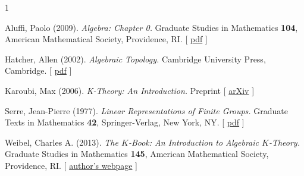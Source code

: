 \documentclass[12pt,reqno]{amsart}
\theoremstyle{plain}
\numberwithin{equation}{section}
\begin{document}
\begin{thebibliography}{1}

Aluffi, Paolo (2009). {\it Algebra: Chapter 0.} Graduate Studies in Mathematics {\bf 104}, American Mathematical Society, Providence, RI. [ \href{https://bpb-us-e1.wpmucdn.com/sites.uw.edu/dist/9/16099/files/2021/12/Aluffi_Algebra.pdf}{pdf} ]\vskip 5pt

Hatcher, Allen (2002). {\it Algebraic Topology.} Cambridge University Press, Cambridge. [ \href{https://pi.math.cornell.edu/~hatcher/AT/AT.pdf}{pdf} ]\vskip 5pt

Karoubi, Max (2006). {\it K-Theory: An Introduction.} Preprint [ \href{https://arxiv.org/abs/math/0602082}{arXiv} ]\vskip 5pt

Serre, Jean-Pierre (1977). {\it Linear Representations of Finite Groups.} Graduate Texts in Mathematics {\bf 42}, Springer-Verlag, New York, NY. [ \href{https://www.math.mcgill.ca/darmon/courses/24-25/algebra4/Serre.pdf}{pdf} ]\vskip 5pt

Weibel, Charles A. (2013). {\it The $K$-Book: An Introduction to Algebraic $K$-Theory.} Graduate Studies in Mathematics {\bf 145}, American Mathematical Society, Providence, RI. [ \href{https://sites.math.rutgers.edu/~weibel/Kbook.html}{author's webpage} ]\vskip 5pt


\end{thebibliography}

% 
\end{document}
